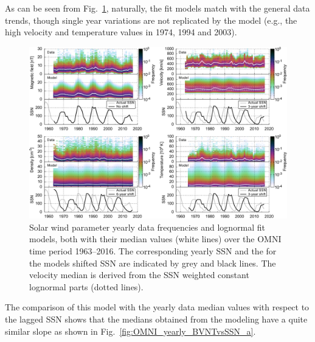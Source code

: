 As can be seen from Fig.~\ref{fig:OMNI_yearly_BVdblNTSSN_fit_e_plot}, naturally, the fit models match with the general data trends, though single year variations are not replicated by the model (e.g., the high velocity and temperature values in 1974, 1994 and 2003).
\begin{figure}
	\includegraphics[width=18cm]{figures/OMNI_yearly_BVdblNTSSN_fit_e_plot.pdf}
	\caption{Solar wind parameter yearly data frequencies and lognormal fit models, both with their median values (white lines) over the OMNI time period 1963--2016. The corresponding yearly SSN and the for the models shifted SSN are indicated by grey and black lines. The velocity median is derived from the SSN weighted constant lognormal parts (dotted lines).}
	\label{fig:OMNI_yearly_BVdblNTSSN_fit_e_plot}
\end{figure}
The comparison of this model with the yearly data median values with respect to the lagged SSN shows that the medians obtained from the modeling have a quite similar slope as shown in Fig.~\ref{fig:OMNI_yearly_BVNTvsSSN_a}.
